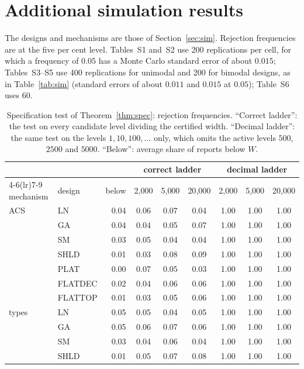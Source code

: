 \section{Additional simulation results}\label{supp:tables}

The designs and mechanisms are those of Section~\ref{sec:sim}. Rejection frequencies are at the five per cent level. Tables~S1 and~S2 use 200 replications per cell, for which a frequency of $0.05$ has a Monte Carlo standard error of about $0.015$; Tables~S3--S5 use 400 replications for unimodal and 200 for bimodal designs, as in Table~\ref{tab:sim} (standard errors of about $0.011$ and $0.015$ at $0.05$); Table~S6 uses 60.

\begin{table}[h]
\centering\small
\caption{Specification test of Theorem~\ref{thm:spec}: rejection frequencies. ``Correct ladder'': the test on every candidate level dividing the certified width. ``Decimal ladder'': the same test on the levels $1,10,100,\dots$ only, which omits the active levels $500$, $2500$ and $5000$. ``Below'': average share of reports below $W$.}\label{tab:S-spec}
\begin{tabular}{llrcccccc}
\toprule
 & & & \multicolumn{3}{c}{correct ladder} & \multicolumn{3}{c}{decimal ladder}\\
\cmidrule(lr){4-6}\cmidrule(lr){7-9}
mechanism & design & below & 2{,}000 & 5{,}000 & 20{,}000 & 2{,}000 & 5{,}000 & 20{,}000\\
\midrule
ACS & LN & 0.04 & 0.06 & 0.07 & 0.04 & 1.00 & 1.00 & 1.00\\
 & GA & 0.04 & 0.04 & 0.05 & 0.07 & 1.00 & 1.00 & 1.00\\
 & SM & 0.03 & 0.05 & 0.04 & 0.04 & 1.00 & 1.00 & 1.00\\
 & SHLD & 0.01 & 0.03 & 0.08 & 0.09 & 1.00 & 1.00 & 1.00\\
 & PLAT & 0.00 & 0.07 & 0.05 & 0.03 & 1.00 & 1.00 & 1.00\\
 & FLATDEC & 0.02 & 0.04 & 0.06 & 0.06 & 1.00 & 1.00 & 1.00\\
 & FLATTOP & 0.01 & 0.03 & 0.05 & 0.06 & 1.00 & 1.00 & 1.00\\
\addlinespace
types & LN & 0.05 & 0.05 & 0.04 & 0.05 & 1.00 & 1.00 & 1.00\\
 & GA & 0.05 & 0.06 & 0.07 & 0.06 & 1.00 & 1.00 & 1.00\\
 & SM & 0.03 & 0.04 & 0.06 & 0.04 & 1.00 & 1.00 & 1.00\\
 & SHLD & 0.01 & 0.05 & 0.07 & 0.08 & 1.00 & 1.00 & 1.00\\

\end{tabular}
\end{table}
